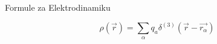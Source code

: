 \documentclass[11pt,twoside]{article}
\date{}
\begin{document}
\begin{center}
\LARGE
Formule za Elektrodinamiku
\end{center}
\normalsize
\begin{multicols}{3}

\begin{footnotesize}

\begin{equation}
\rho(\vec{r}) = \sum_\alpha q_a \delta^{(3)}(\vec{r}-\vec{r_\alpha})
\end{equation}


\end{footnotesize}
\end{multicols}
\end{document}

